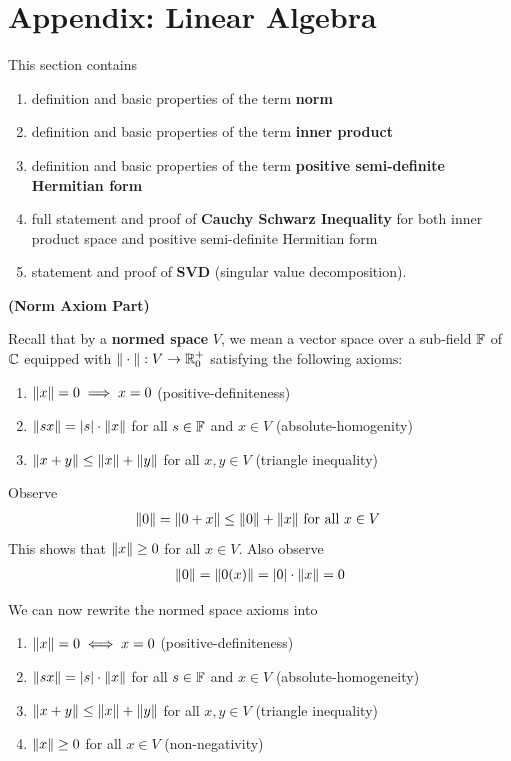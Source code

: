\documentclass{report}
\begin{document}
\section{Appendix: Linear Algebra}
\begin{mdframed}
This section contains
\begin{enumerate}[label=(\alph*)]
  \item definition and basic properties of the term \textbf{norm}
  \item definition and basic properties of the term \textbf{inner product}
  \item definition and basic properties of the term \textbf{positive semi-definite Hermitian form}
  \item full statement and proof of \textbf{Cauchy Schwarz Inequality} for both inner product space and positive semi-definite Hermitian form  
  \item statement and proof of \textbf{SVD} (singular value decomposition). 
\end{enumerate}
\end{mdframed}
\textbf{(Norm Axiom Part)}
\begin{mdframed}
Recall that by a \textbf{normed space} $V$, we mean a vector space over a sub-field $\mathbb{F}$ of $\mathbb{C}$ equipped with  $\| \cdot \|:V\to \mathbb{R}_0^+$ satisfying the following $\underline{\text{axioms}}$: 
\begin{enumerate}[label=(\alph*)]
  \item $\| x \|=0 \implies x=0$ (positive-definiteness)
  \item $\| sx \|=\left|s\right|\cdot \| x \|$ for all $s \in \mathbb{F}$ and $x\in V$ (absolute-homogenity)
  \item $\| x+y \|\leq \| x \|+\| y \|$ for all $x,y \in V$ (triangle inequality)
\end{enumerate}
Observe
\begin{align*}
\| 0 \|=\| 0+x \|\leq \| 0 \|+\| x \|\text{ for all $x\in V$ }
\end{align*}
This shows that $\| x \|\geq 0$ for all $x\in V$. Also observe 
\begin{align*}
\| 0 \|=\| 0(x) \|=\left|0\right|\cdot \| x \|=0
\end{align*}

We can now rewrite the normed space axioms into
\begin{enumerate}[label=(\alph*)]
  \item $\| x \|=0\iff x=0$ (positive-definiteness)
  \item $\| sx \|=\left|s\right|\cdot \| x \|$ for all $s \in \mathbb{F}$ and $x\in V$ (absolute-homogeneity)
  \item $\| x+y \|\leq \| x \|+\| y \|$ for all $x,y \in V$ (triangle inequality)
  \item $\| x \|\geq 0$ for all $x \in V$ (non-negativity)
\end{enumerate}
\end{mdframed}
\end{document}
